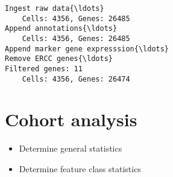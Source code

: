 \documentclass[11pt]{article}
\providecommand{\tightlist}{%
      \setlength{\itemsep}{0pt}\setlength{\parskip}{0pt}}
\begin{document}
    \begin{Verbatim}[commandchars=\\\{\}]
Ingest raw data{\ldots}
	Cells: 4356, Genes: 26485
Append annotations{\ldots}
	Cells: 4356, Genes: 26485
Append marker gene expresssion{\ldots}
Remove ERCC genes{\ldots}
Filtered genes: 11
	Cells: 4356, Genes: 26474

    \end{Verbatim}

    \section{Cohort analysis}\label{cohort-analysis}

\begin{itemize}
\tightlist
\item
  Determine general statistics
\item
  Determine feature class statistics
\end{itemize}
\end{document}
